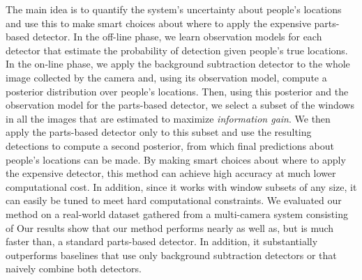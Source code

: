 \documentclass[10pt,twocolumn,letterpaper]{article}
\begin{document}
The main idea is to quantify the system's uncertainty about people's locations and use this to make smart choices about where to apply the expensive parts-based detector. In the off-line phase, we learn observation models for each detector that estimate the probability of detection given people's true locations. In the on-line phase, we apply the background subtraction detector to the whole image collected by the camera and, using its observation model, compute a posterior distribution over people's locations. Then, using this posterior and the observation model for the parts-based detector, we select a subset of the windows in all the images that are estimated to maximize \emph{information gain}. We then apply the parts-based detector only to this subset and use the resulting detections to compute a second posterior, from which final predictions about people's locations can be made. By making smart choices about where to apply the expensive detector, this method can achieve high accuracy at much lower computational cost. In addition, since it works with window subsets of any size, it can easily be tuned to meet hard computational constraints.
We evaluated our method on a real-world dataset gathered from a multi-camera system  consisting of  Our results show that our method performs nearly as well as, but is much faster than, a standard parts-based detector. In addition, it substantially outperforms baselines that use only background subtraction detectors or that naively combine both detectors.
\end{document}
